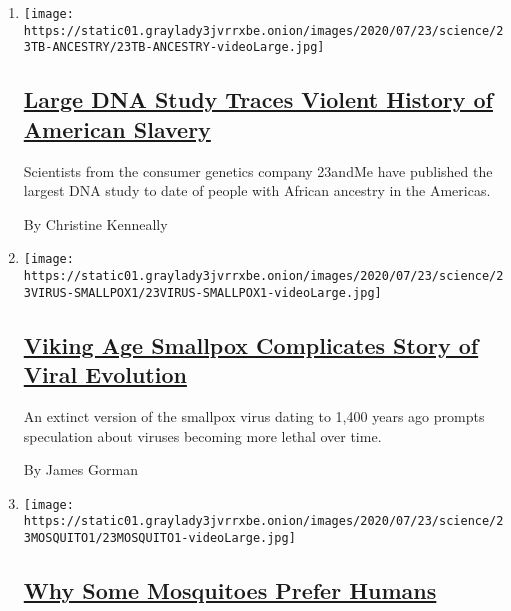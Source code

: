 \begin{enumerate}
\def\labelenumi{\arabic{enumi}.}
\item
  \texttt{[image: https://static01.graylady3jvrrxbe.onion/images/2020/07/23/science/23TB-ANCESTRY/23TB-ANCESTRY-videoLarge.jpg]}

  \hypertarget{large-dna-study-traces-violent-history-of-american-slavery}{%
  \subsection{\texorpdfstring{\href{/2020/07/23/science/23andme-african-ancestry.html}{Large
  DNA Study Traces Violent History of American
  Slavery}}{Large DNA Study Traces Violent History of American Slavery}}\label{large-dna-study-traces-violent-history-of-american-slavery}}

  Scientists from the consumer genetics company 23andMe have published
  the largest DNA study to date of people with African ancestry in the
  Americas.

  By Christine Kenneally
\item
  \texttt{[image: https://static01.graylady3jvrrxbe.onion/images/2020/07/23/science/23VIRUS-SMALLPOX1/23VIRUS-SMALLPOX1-videoLarge.jpg]}

  \hypertarget{viking-age-smallpox-complicates-story-of-viral-evolution}{%
  \subsection{\texorpdfstring{\href{/2020/07/23/science/smallpox-vikings-genetics.html}{Viking
  Age Smallpox Complicates Story of Viral
  Evolution}}{Viking Age Smallpox Complicates Story of Viral Evolution}}\label{viking-age-smallpox-complicates-story-of-viral-evolution}}

  An extinct version of the smallpox virus dating to 1,400 years ago
  prompts speculation about viruses becoming more lethal over time.

  By James Gorman
\item
  \texttt{[image: https://static01.graylady3jvrrxbe.onion/images/2020/07/23/science/23MOSQUITO1/23MOSQUITO1-videoLarge.jpg]}

  \hypertarget{why-some-mosquitoes-prefer-humans}{%
  \subsection{\texorpdfstring{\href{/2020/07/23/science/mosquitoes-genetics-africa.html}{Why
  Some Mosquitoes Prefer
  Humans}}{Why Some Mosquitoes Prefer Humans}}\label{why-some-mosquitoes-prefer-humans}}


\end{enumerate}

